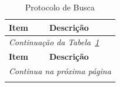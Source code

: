 \begin{longtable}{|p{4.5cm}|p{10.6cm}|}
    \caption{Protocolo de Busca}
    \label{tab-protocolo} \\
    \hline
    \textbf{Item} & \textbf{Descrição} \\
    \hline
    \endfirsthead

    \multicolumn{2}{l}{\small\textit{Continuação da Tabela~\ref{tab-protocolo}}} \\
    \hline
    \textbf{Item} & \textbf{Descrição} \\
    \hline
    \endhead

    \hline
    \multicolumn{2}{r}{\small\textit{Continua na próxima página}} \\
    \endfoot

    \hline
    \endlastfoot


\end{longtable}
